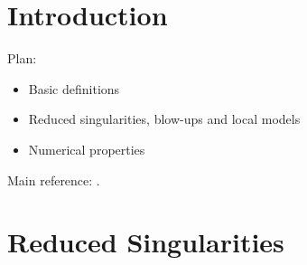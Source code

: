 
\section{Introduction}

Plan:
\begin{itemize}
    \item Basic definitions %
    \item Reduced singularities, blow-ups and local models
    \item Numerical properties %
\end{itemize}
Main reference: \cite{brunella_book}.

\section{Reduced Singularities}

